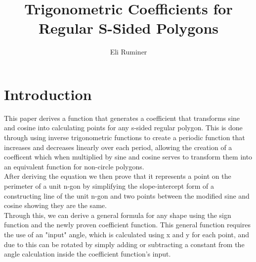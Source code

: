 \documentclass[11pt]{article}
\title{Trigonometric Coefficients for Regular S-Sided Polygons}
\author{Eli Ruminer}
\date{}
\begin{document}
\begin{titlepage}
\clearpage\maketitle
\thispagestyle{empty}
\end{titlepage}

\tableofcontents
\newpage

\section{Introduction}
This paper derives a function that generates a coefficient that transforms sine and cosine into calculating points for any s-sided regular polygon. This is done through using inverse trigonometric functions to create a periodic function that increases and decreases linearly over each period, allowing the creation of a coefficent which when multiplied by sine and cosine serves to transform them into an equivalent function for non-circle polygons.\\
 After deriving the equation we then prove that it represents a point on the perimeter of a unit n-gon by simplifying the slope-intercept form of a constructing line of the unit n-gon and two points between the modified sine and cosine showing they are the same. \\
Through this, we can derive a general formula for any shape using the sign function and the newly proven coefficient function. This general function requires the use of an "input" angle, which is calculated using x and y for each point, and due to this can be rotated by simply adding or subtracting a constant from the angle calculation inside the coefficient function's input.
\end{document}
